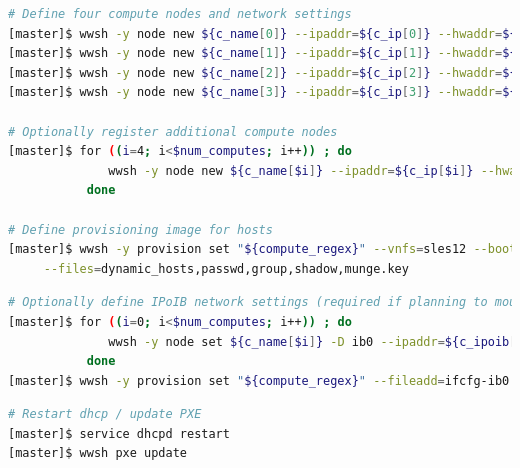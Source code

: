 \documentclass[letterpaper]{article}
\begin{document}
\begin{lstlisting}[language=bash,keywords={},upquote=true,basicstyle=\footnotesize\ttfamily]
# Define four compute nodes and network settings 
[master]$ wwsh -y node new ${c_name[0]} --ipaddr=${c_ip[0]} --hwaddr=${c_mac[0]} -D ${eth_provision}
[master]$ wwsh -y node new ${c_name[1]} --ipaddr=${c_ip[1]} --hwaddr=${c_mac[1]} -D ${eth_provision}
[master]$ wwsh -y node new ${c_name[2]} --ipaddr=${c_ip[2]} --hwaddr=${c_mac[2]} -D ${eth_provision}
[master]$ wwsh -y node new ${c_name[3]} --ipaddr=${c_ip[3]} --hwaddr=${c_mac[3]} -D ${eth_provision}

# Optionally register additional compute nodes
[master]$ for ((i=4; i<$num_computes; i++)) ; do
              wwsh -y node new ${c_name[$i]} --ipaddr=${c_ip[$i]} --hwaddr=${c_mac[$i]} -D ${eth_provision}
           done

# Define provisioning image for hosts
[master]$ wwsh -y provision set "${compute_regex}" --vnfs=sles12 --bootstrap=`uname -r` \
     --files=dynamic_hosts,passwd,group,shadow,munge.key 
\end{lstlisting}

\begin{lstlisting}[language=bash,keywords={},upquote=true,basicstyle=\footnotesize\ttfamily]
# Optionally define IPoIB network settings (required if planning to mount Lustre over IB)
[master]$ for ((i=0; i<$num_computes; i++)) ; do
              wwsh -y node set ${c_name[$i]} -D ib0 --ipaddr=${c_ipoib[$i]} --netmask=${ipoib_netmask}
           done
[master]$ wwsh -y provision set "${compute_regex}" --fileadd=ifcfg-ib0.ww
\end{lstlisting}

\begin{lstlisting}[language=bash,keywords={},upquote=true,basicstyle=\footnotesize\ttfamily]
# Restart dhcp / update PXE
[master]$ service dhcpd restart
[master]$ wwsh pxe update
\end{lstlisting}


\end{document}
